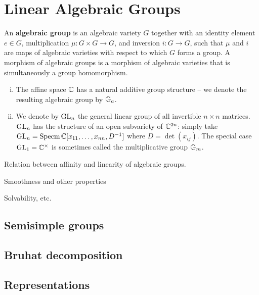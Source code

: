 \chapter{Linear Algebraic Groups}


\begin{definition}
    An \textbf{algebraic group} is an algebraic variety $G$ together with an identity
    element $e\in G$, multiplication $\mu:G\times G\to G$, and inversion
    $i:G\to G$, such that $\mu$ and $i$ are maps of algebraic varieties
    with respect to which $G$ forms a group. A morphism of algebraic groups
    is a morphism of algebraic varieties that is simultaneously a group
    homomorphism.
\end{definition}

\begin{example}
    \hspace{1mm} 
    \begin{enumerate}[(i)]
        \item The affine space $\mathbb{C}$ has a natural additive group structure --
            we denote the resulting algebraic group by $\mathbb{G}_a$.
        \item We denote by $\operatorname{GL}_n$ the general linear group of all invertible
            $n\times n$ matrices. $\operatorname{GL}_n$ has the structure of an open subvariety
            of $\mathbb{C}^{2n}$: simply take $\operatorname{GL}_n=\operatorname{Specm}\mathbb{C}[x_{11},\ldots,x_{nn},D^{-1}]$
            where $D=\det(x_{ij})$. The special case $\operatorname{GL}_1=\mathbb{C}^\times$ is sometimes
            called the multiplicative group $\mathbb{G}_m$.
    \end{enumerate}
\end{example}

\begin{theorem}
    Relation between affinity and linearity of algebraic groups.
\end{theorem}

\begin{theorem}
    Smoothness and other properties
\end{theorem}

\begin{definition}
    Solvability, etc.
\end{definition}

\section{Semisimple groups}
\section{Bruhat decomposition}
\section{Representations}
